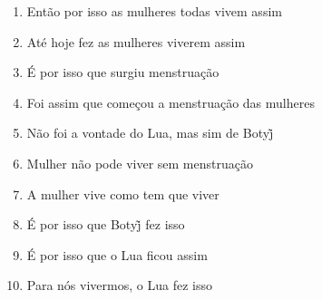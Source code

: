 \begin{enumerate}
\begin{center}\end{center}

\item Então por isso as mulheres todas vivem assim
\item Até hoje fez as mulheres viverem assim
\item É por isso que surgiu menstruação
\item Foi assim que começou a menstruação das mulheres
\item Não foi a vontade do Lua, mas sim de Botyj̃
\item Mulher não pode viver sem menstruação
\item A mulher vive como tem que viver
\item É por isso que Botyj̃ fez isso
\item É por isso que o Lua ficou assim
\item Para nós vivermos, o Lua fez isso
\end{enumerate}





















